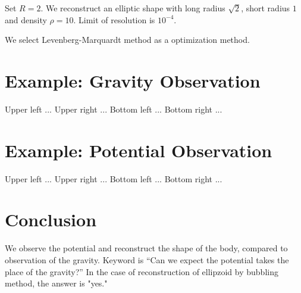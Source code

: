 \documentclass[uplatex,12pt]{jsarticle}
\begin{document}
Set $R=2$.
We reconstruct an elliptic shape with long radius $\sqrt{2}$, short radius $1$ and density $\rho=10$.
Limit of resolution is $10^{-4}$.

We select Levenberg-Marquardt method as a optimization method.

\section{Example: Gravity Observation}

Upper left ... 
Upper right ... 
Bottom left ...
Bottom right ...


\section{Example: Potential Observation}

Upper left ... 
Upper right ... 
Bottom left ...
Bottom right ...

\section{Conclusion}

We observe the potential and reconstruct the shape of the body, compared to observation of the gravity.
Keyword is ``Can we expect the potential takes the place of the gravity?''
In the case of reconstruction of ellipzoid by bubbling method, the answer is "yes."
\end{document}
